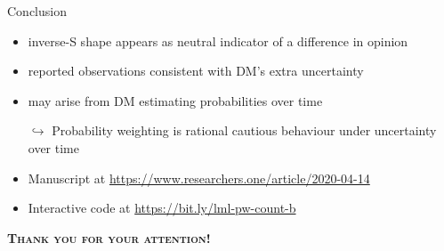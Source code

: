 \begin{frame}{Conclusion}
\begin{itemize}
  \item inverse-S shape appears as neutral indicator of a difference in opinion
	\item reported observations consistent with DM's extra uncertainty
	\item may arise from DM estimating probabilities over time
  \item[$\hookrightarrow$] Probability weighting is rational cautious behaviour under uncertainty over time
  \item[]
  \item Manuscript at \url{https://www.researchers.one/article/2020-04-14}
  \item Interactive code at \url{https://bit.ly/lml-pw-count-b}    
\end{itemize}


\pause
\centering
\vfill
{\Large \textsc{\textbf{Thank you for your attention!}}}

\end{frame}
